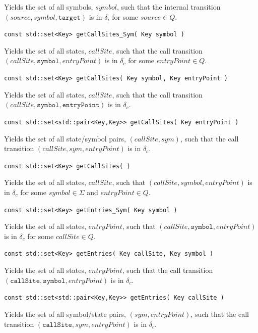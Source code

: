 \documentclass{llncs}
\begin{document}
\begin{description}
    Yields the set of all symbols, $symbol$, such that the internal
    transition $(source,symbol,\texttt{target})$ is in $\delta_i$ for some
    $source \in Q$.

  \item\texttt{const std::set<Key> getCallSites\_Sym( Key symbol )} \nopagebreak

    Yields the set of all states, $callSite$, such that the call transition
    $(callSite,\texttt{symbol},entryPoint)$ is in $\delta_c$ for some
    $entryPoint \in Q$.

  \item\texttt{const std::set<Key> getCallSites( Key symbol, Key entryPoint )} \nopagebreak

    Yields the set of all states, $callSite$, such that the call transition
    $(callSite,\texttt{symbol},\texttt{entryPoint})$ is in $\delta_c$.

  \item\texttt{const std::set<std::pair<Key,Key>> getCallSites( Key entryPoint )}

    Yields the set of all state/symbol pairs, $(callSite,sym)$, such that the
    call transition $(callSite,sym,entryPoint)$ is in $\delta_c$.

  \item\texttt{const std::set<Key> getCallSites( )} \nopagebreak

    Yields the set of all states, $callSite$, such that
    $(callSite,symbol,entryPoint)$ is in $\delta_c$ for some $symbol \in
    \Sigma$ and $entryPoint \in Q$.

  \item\texttt{const std::set<Key> getEntries\_Sym( Key symbol )} \nopagebreak

    Yields the set of all states, $entryPoint$, such that
    $(callSite,\texttt{symbol},entryPoint)$ is in $\delta_c$ for some
    $callSite \in Q$.

  \item\texttt{const std::set<Key> getEntries( Key callSite, Key symbol )} \nopagebreak

    Yields the set of all states, $entryPoint$, such that the call transition
    $(\texttt{callSite},\texttt{symbol},entryPoint)$ is in $\delta_c$.

  \item\texttt{const std::set<std::pair<Key,Key>> getEntries( Key callSite )} \nopagebreak

    Yields the set of all symbol/state pairs, $(sym,entryPoint)$, such that
    the call transition $(\texttt{callSite},sym,entryPoint)$ is in
    $\delta_c$.


\end{description}
\end{document}
